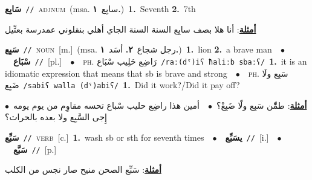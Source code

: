 \documentclass[10pt,a4paper,twoside]{article} %
\begin{document}
\begin{multicols}{2}
{{{{{{\setlength\topsep{0pt}\textbf{\foreignlanguage{arabic}{سَابِع}}\ {\color{gray}\texttt{//}\color{black}}\ \textsc{adj\textunderscore num}\ \color{gray}(msa. \foreignlanguage{arabic}{سابِع}~\foreignlanguage{arabic}{\textbf{١.}})\color{black}\ \textbf{1.}~Seventh  \textbf{2.}~7th\  \begin{flushright}\color{gray}\foreignlanguage{arabic}{\textbf{\underline{\foreignlanguage{arabic}{أمثلة}}}: أنا هلا بصف سابِع السنة السنة الجاي أهلي بنقلوني عمدرسة بعتِّيل}\end{flushright}\color{black}} \vspace{2mm}

{\setlength\topsep{0pt}\textbf{\foreignlanguage{arabic}{سَبِع}}\ {\color{gray}\texttt{//}\color{black}}\ \textsc{noun}\ [m.]\ \color{gray}(msa. \foreignlanguage{arabic}{رجل شجاع}~\foreignlanguage{arabic}{\textbf{٢.}}  \foreignlanguage{arabic}{أسَد}~\foreignlanguage{arabic}{\textbf{١.}})\color{black}\ \textbf{1.}~lion  \textbf{2.}~a brave man\ \ $\bullet$\ \ \setlength\topsep{0pt}\textbf{\foreignlanguage{arabic}{سْبَاع}}\ {\color{gray}\texttt{//}\color{black}}\ [pl.]\ \ $\bullet$\ \ \textsc{ph.} \color{gray} \foreignlanguage{arabic}{رَاضِع حَلِيب سْبَاع}\color{black}\ {\color{gray}\texttt{/{\sffamily raː(dˤ)iʕ ħaliːb sbaːʕ}/}\color{black}}\ \textbf{1.}~it is an idiomatic expression that means that sb is brave and strong\ \ $\bullet$\ \ \textsc{ph.} \color{gray} \foreignlanguage{arabic}{سَبِع ولَا ضَبِع}\color{black}\ {\color{gray}\texttt{/{\sffamily sabiʕ walla (dˤ)abiʕ}/}\color{black}}\ \textbf{1.}~Did it work?/Did it pay off?\  \begin{flushright}\color{gray}\foreignlanguage{arabic}{\textbf{\underline{\foreignlanguage{arabic}{أمثلة}}}: طمِّّن سَبِع ولّا ضَبِعْ؟\ $\bullet$\ \  أمين هذا راضِع حليب سْباع تحسه مقاوِم من يوم يومه\ $\bullet$\ \  إِجى السَّبِع ولا بعده بالحراث؟}\end{flushright}\color{black}} \vspace{2mm}

{\setlength\topsep{0pt}\textbf{\foreignlanguage{arabic}{سَبِّع}}\ {\color{gray}\texttt{//}\color{black}}\ \textsc{verb}\ [c.]\ \textbf{1.}~wash sb or sth for seventh times\ \ $\bullet$\ \ \setlength\topsep{0pt}\textbf{\foreignlanguage{arabic}{يسَبِّع}}\ {\color{gray}\texttt{//}\color{black}}\ [i.]\ \ $\bullet$\ \ \setlength\topsep{0pt}\textbf{\foreignlanguage{arabic}{سَبَّع}}\ {\color{gray}\texttt{//}\color{black}}\ [p.]\  \begin{flushright}\color{gray}\foreignlanguage{arabic}{\textbf{\underline{\foreignlanguage{arabic}{أمثلة}}}: سَبِّع الصحن منيح صار نجس من الكلب}\end{flushright}\color{black}} \vspace{2mm}

}}}}}
\end{multicols}
\end{document}
